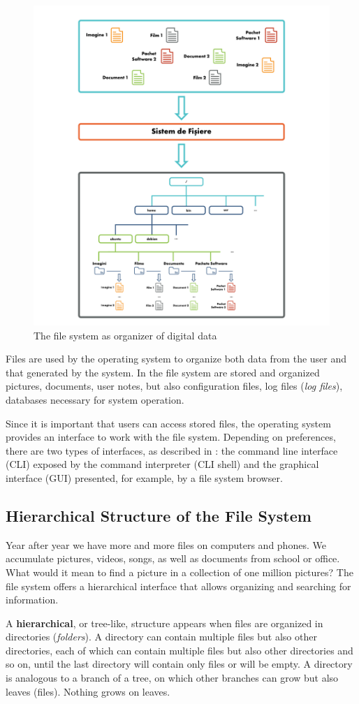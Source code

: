 \begin{figure}[htbp]
  \centering
  \includegraphics[width=0.5\columnwidth]{chapters/03-data-files/img/def-fs.pdf}
  \caption{The file system as organizer of digital data}
  \label{fig:data-files:def-fs}
\end{figure}

Files are used by the operating system to organize both data from the user and that generated by the system.
In the file system are stored and organized pictures, documents, user notes, but also configuration files, log files (\textit{log files}), databases necessary for system operation.

Since it is important that users can access stored files, the operating system provides an interface to work with the file system.
Depending on preferences, there are two types of interfaces, as described in : the command line interface (CLI) exposed by the command interpreter (CLI shell) and the graphical interface (GUI) presented, for example, by a file system browser.

\subsection{Hierarchical Structure of the File System}
\label{sec:data-files:filesystem}

Year after year we have more and more files on computers and phones.
We accumulate pictures, videos, songs, as well as documents from school or office.
What would it mean to find a picture in a collection of one million pictures? The file system offers a hierarchical interface that allows organizing and searching for information.

A \textbf{hierarchical}, or tree-like, structure appears when files are organized in directories (\textit{folders}).
A directory can contain multiple files but also other directories, each of which can contain multiple files but also other directories and so on, until the last directory will contain only files or will be empty.
A directory is analogous to a branch of a tree, on which other branches can grow but also leaves (files).
Nothing grows on leaves.

